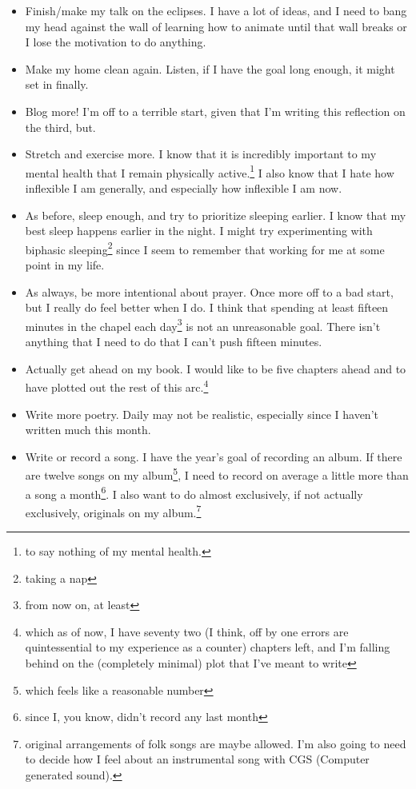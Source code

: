\documentclass[12pt]{article}[titlepage]
\renewcommand{\,}{\textsuperscript{,}}
\begin{document}
\begin{itemize}
\item Finish/make my talk on the eclipses.
I have a lot of ideas, and I need to bang my head against the wall of learning how to animate until that wall breaks or I lose the motivation to do anything.
\item Make my home clean again.
Listen, if I have the goal long enough, it might set in finally.
\item Blog more!
I'm off to a terrible start, given that I'm writing this reflection on the third, but.
\item Stretch and exercise more.
I know that it is incredibly important to my mental health that I remain physically active.\footnote{to say nothing of my mental health.}
I also know that I hate how inflexible I am generally, and especially how inflexible I am now.
\item As before, sleep enough, and try to prioritize sleeping earlier.
I know that my best sleep happens earlier in the night.
I might try experimenting with biphasic sleeping\footnote{taking a nap} since I seem to remember that working for me at some point in my life.
\item As always, be more intentional about prayer.
Once more off to a bad start, but I really do feel better when I do.
I think that spending at least fifteen minutes in the chapel each day\footnote{from now on, at least} is not an unreasonable goal.
There isn't anything that I need to do that I can't push fifteen minutes.
\item Actually get ahead on my book.
I would like to be five chapters ahead and to have plotted out the rest of this arc.\footnote{which as of now, I have seventy two (I think, off by one errors are quintessential to my experience as a counter) chapters left, and I'm falling behind on the (completely minimal) plot that I've meant to write}
\item Write more poetry.
Daily may not be realistic, especially since I haven't written much this month.
\item Write or record a song.
I have the year's goal of recording an album.
If there are twelve songs on my album\footnote{which feels like a reasonable number}, I need to record on average a little more than a song a month\footnote{since I, you know, didn't record any last month}.
I also want to do almost exclusively, if not actually exclusively, originals on my album.\footnote{original arrangements of folk songs are maybe allowed.
I'm also going to need to decide how I feel about an instrumental song with CGS (Computer generated sound). 
}
\end{itemize}
\end{document}

